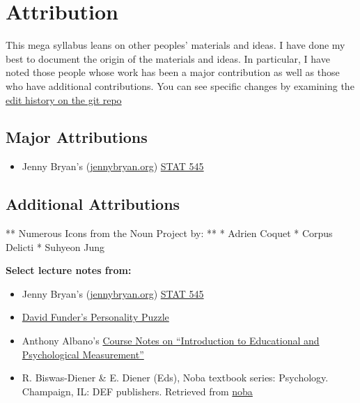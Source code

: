 \documentclass[
]{book}
\providecommand{\tightlist}{%
  \setlength{\itemsep}{0pt}\setlength{\parskip}{0pt}}
\begin{document}
\hypertarget{attribution}{%
\chapter*{Attribution}\label{attribution}}

This mega syllabus leans on other peoples' materials and ideas. I have done my best to document the origin of the materials and ideas. In particular, I have noted those people whose work has been a major contribution as well as those who have additional contributions. You can see specific changes by examining the \href{https://github.com/smasongarrison/Syllabi/commits/main}{edit history on the git repo}

\hypertarget{major-attributions}{%
\section*{Major Attributions}\label{major-attributions}}

\begin{itemize}
\tightlist
\item
  Jenny Bryan's (\href{https://jennybryan.org}{jennybryan.org}) \href{https://stat545.com}{STAT 545}
\end{itemize}

\hypertarget{additional-attributions}{%
\section*{Additional Attributions}\label{additional-attributions}}

** Numerous Icons from the Noun Project by: **
* Adrien Coquet
* Corpus Delicti
* Suhyeon Jung

\textbf{Select lecture notes from:}

\begin{itemize}
\tightlist
\item
  Jenny Bryan's (\href{https://jennybryan.org/}{jennybryan.org}) \href{https://stat545.com/}{STAT 545}
\item
  \href{https://wwnorton.com/books/The-Personality-Puzzle/}{David Funder's Personality Puzzle}
\item
  Anthony Albano's \href{https://www.thetaminusb.com/intro-measurement-r/}{Course Notes on ``Introduction to Educational and Psychological Measurement''}
\item
  R. Biswas-Diener \& E. Diener (Eds), Noba textbook series: Psychology. Champaign, IL: DEF publishers. Retrieved from \href{https://nobaproject.com/}{noba}
\end{itemize}
\end{document}

